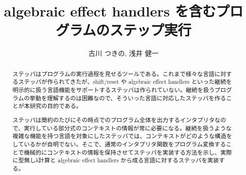 \documentclass[japanese,draft]{jssst_ppl} %
\title{algebraic effect handlers を含むプログラムのステップ実行}
\author{古川 つきの, 浅井 健一}
\begin{document}
\maketitle
\begin{abstract}
  ステッパはプログラムの実行過程を見せるツールである。これまで様々な言語に対するステッパが作られてきたが、shift/reset や algebraic effect handlers といった継続を明示的に扱う言語機能をサポートするステッパは作られていない。継続を扱うプログラムの挙動を理解するのは困難なので、そういった言語に対応したステッパを作ることが本研究の目的である。
  
  ステッパは簡約のたびにその時点でのプログラム全体を出力するインタプリタなので、実行している部分式のコンテキストの情報が常に必要になる。継続を扱うような複雑な機能を持つ言語を対象にしたステッパでは、コンテキストがどのような構造をしているかが自明でない。そこで、通常のインタプリタ関数をプログラム変換することで機械的にコンテキストの情報を保持させてステッパを実装する方法を示し、実際に型無しλ計算と algebraic effect handlers から成る言語に対するステッパを実装する。
\end{abstract}



















\end{document}
